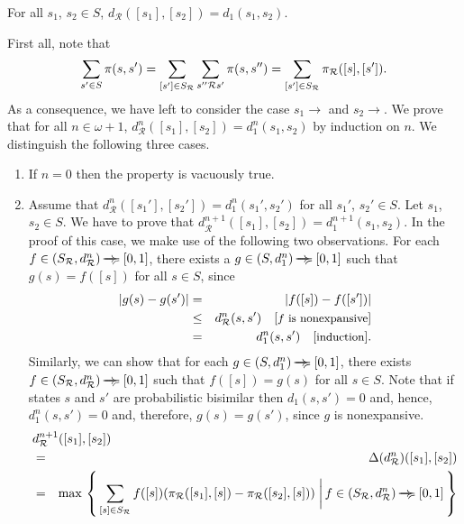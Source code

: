 \documentclass{LMCS}
\newcommand{\ndi}{\mathbin{\raisebox{0.15ex}{-\hspace{-0.2em}-\hspace{-0.2em}-\hspace{-0.2em}-\hspace{-0.2em}-\hspace{-0.2em}-}\hspace{-0.7em}\succcurlyeq}}
\newcommand{\comment}[1]{\hspace{1em}\mbox{[{\small #1}]}}
\newcommand{\bigmid}{\; \bigg| \,}
\begin{document}
\begin{prop}
\label{proposition:B}
For all $s_1$, $s_2 \in S$, $d_{\mathcal{R}}([s_1], [s_2]) = d_1(s_1, s_2)$.
\end{prop}
\proof First all, note that
\begin{displaymath}
\sum_{s' \in S} \pi(s, s')
= \sum_{[s'] \in S_{\mathcal{R}}} \sum_{s'' \mathbin{\mathcal{R}} s'} \pi(s, s'')\\
= \sum_{[s'] \in S_{\mathcal{R}}} \pi_{\mathcal{R}}([s], [s']).
\end{displaymath}
As a consequence, we have left to consider the case $s_1 \rightarrow$
and $s_2 \rightarrow$.  We prove that for all $n \in \omega + 1$,
$d_{\mathcal{R}}^n([s_1], [s_2]) = d_1^n(s_1, s_2)$ by induction on $n$.
We distinguish the following three cases.
\begin{enumerate}[$\bullet$]
\item
If $n = 0$ then the property is vacuously true.
\item
Assume that $d_{\mathcal{R}}^n([s_1'], [s_2']) = d_1^n(s_1', s_2')$ for all $s_1'$, $s_2' \in S$.
Let $s_1$, $s_2 \in S$.  We have to prove that $d_{\mathcal{R}}^{n+1}([s_1], [s_2]) = d_1^{n+1}(s_1, s_2)$.
In the proof of this case, we make use of the following two observations.  
For each $f \in (S_{\mathcal{R}}, d_{\mathcal{R}}^n) \ndi [0, 1]$, there exists a $g \in (S, d_1^n) \ndi [0, 1]$
such that $g(s) = f([s])$ for all $s \in S$, since
\begin{eqnarray*}
| g(s) - g(s') |
& = & | f([s]) - f([s']) |\\
& \leq & d_{\mathcal{R}}^n(s, s') 
\comment{$f$ is nonexpansive}\\
& = & d_1^n(s, s') 
\comment{induction}.
\end{eqnarray*} 
Similarly, we can show that for each $g \in (S, d_1^n) \ndi [0, 1]$, there exists
$f \in (S_{\mathcal{R}}, d_{\mathcal{R}}^n) \ndi [0, 1]$ such that $f([s]) = g(s)$ for all $s \in S$.
Note that if states $s$ and $s'$ are probabilistic bisimilar then 
$d_1(s, s') = 0$ and, hence, $d_1^n(s, s') = 0$ and, therefore, $g(s) = g(s')$,
since $g$ is nonexpansive.
\begin{eqnarray*}
\lefteqn{d_{\mathcal{R}}^{n+1}([s_1], [s_2])}\\
& = & \Delta(d_{\mathcal{R}}^n)([s_1], [s_2])\\
& = & \max\, \left \{\, \sum_{[s] \in S_{\mathcal{R}}} f([s]) (\pi_{\mathcal{R}}([s_1], [s]) - \pi_{\mathcal{R}}([s_2], [s])) \bigmid f \in (S_{\mathcal{R}}, d_{\mathcal{R}}^n) \ndi [0, 1] \, \right \}\\

\end{eqnarray*}
\end{enumerate}
\end{document}
